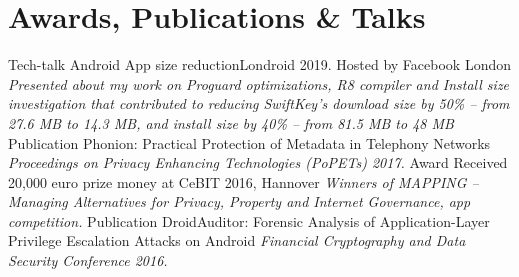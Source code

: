 \documentclass[]{friggeri-cv}
\begin{document}
\section{Awards, Publications \& Talks}
	\begin{entrylist}
        \entry
            {Tech-talk}
            {Android App size reduction}{Londroid 2019. Hosted by Facebook London}
            {\emph{Presented about my work on Proguard optimizations, R8 compiler and Install size investigation that contributed to reducing SwiftKey's download size by 50\% -- from 27.6 MB to 14.3 MB, and install size by 40\% -- from 81.5 MB to 48 MB}}
        \entry
            {Publication}
            {Phonion: Practical Protection of Metadata in Telephony Networks}{}
            {\emph{Proceedings on Privacy Enhancing Technologies (PoPETs) 2017.}}
        \entry
            {Award}
            {Received 20,000 euro prize money at CeBIT 2016, Hannover}{}
            {\emph{Winners of MAPPING -- Managing Alternatives for Privacy, Property and Internet Governance, app competition.}}
        \entry
            {Publication}
            {DroidAuditor: Forensic Analysis of Application-Layer Privilege Escalation Attacks on Android}{}
            {\emph{Financial Cryptography and Data Security Conference 2016.}}        
	\end{entrylist}
\end{document}
